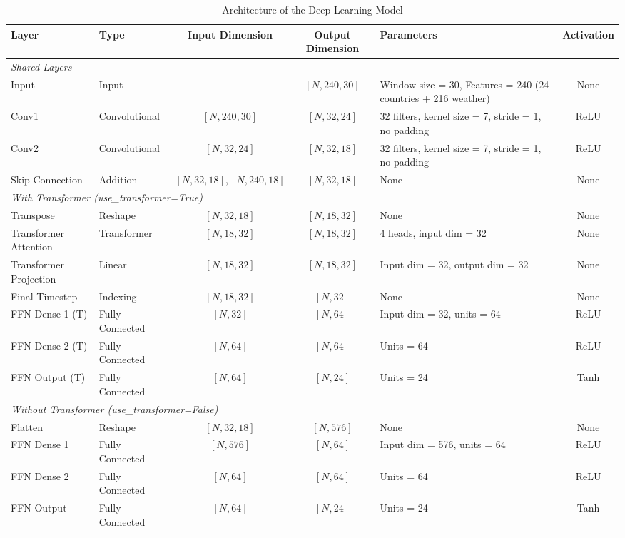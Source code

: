 \documentclass[12pt]{article}
\begin{document}
\begin{table}[h]
\centering
\scriptsize

\begin{tabular}{l l c c p{4cm} c}
\toprule
\textbf{Layer} & \textbf{Type} & \textbf{Input Dimension} & \textbf{Output Dimension} & \textbf{Parameters} & \textbf{Activation} \\
\midrule
\multicolumn{6}{l}{\textit{Shared Layers}} \\
\midrule
Input & Input & - & $[N, 240, 30]$ & Window size = 30, Features = 240 (24 countries + 216 weather) & None \\
Conv1 & Convolutional & $[N, 240, 30]$ & $[N, 32, 24]$ & 32 filters, kernel size = 7, stride = 1, no padding & ReLU \\
Conv2 & Convolutional & $[N, 32, 24]$ & $[N, 32, 18]$ & 32 filters, kernel size = 7, stride = 1, no padding & ReLU \\
Skip Connection & Addition & $[N, 32, 18], [N, 240, 18]$ & $[N, 32, 18]$ & None & None \\
\midrule
\multicolumn{6}{l}{\textit{With Transformer (use\_transformer=True)}} \\
\midrule
Transpose & Reshape & $[N, 32, 18]$ & $[N, 18, 32]$ & None & None \\
Transformer Attention & Transformer & $[N, 18, 32]$ & $[N, 18, 32]$ & 4 heads, input dim = 32 & None \\
Transformer Projection & Linear & $[N, 18, 32]$ & $[N, 18, 32]$ & Input dim = 32, output dim = 32 & None \\
Final Timestep & Indexing & $[N, 18, 32]$ & $[N, 32]$ & None & None \\
FFN Dense 1 (T) & Fully Connected & $[N, 32]$ & $[N, 64]$ & Input dim = 32, units = 64 & ReLU \\
FFN Dense 2 (T) & Fully Connected & $[N, 64]$ & $[N, 64]$ & Units = 64 & ReLU \\
FFN Output (T) & Fully Connected & $[N, 64]$ & $[N, 24]$ & Units = 24 & Tanh \\
\midrule
\multicolumn{6}{l}{\textit{Without Transformer (use\_transformer=False)}} \\
\midrule
Flatten & Reshape & $[N, 32, 18]$ & $[N, 576]$ & None & None \\
FFN Dense 1 & Fully Connected & $[N, 576]$ & $[N, 64]$ & Input dim = 576, units = 64 & ReLU \\
FFN Dense 2 & Fully Connected & $[N, 64]$ & $[N, 64]$ & Units = 64 & ReLU \\
FFN Output & Fully Connected & $[N, 64]$ & $[N, 24]$ & Units = 24 & Tanh \\
\bottomrule
\end{tabular}
\caption{Architecture of the Deep Learning Model}
\label{tab:model_architecture}
\end{table}
\end{document}
